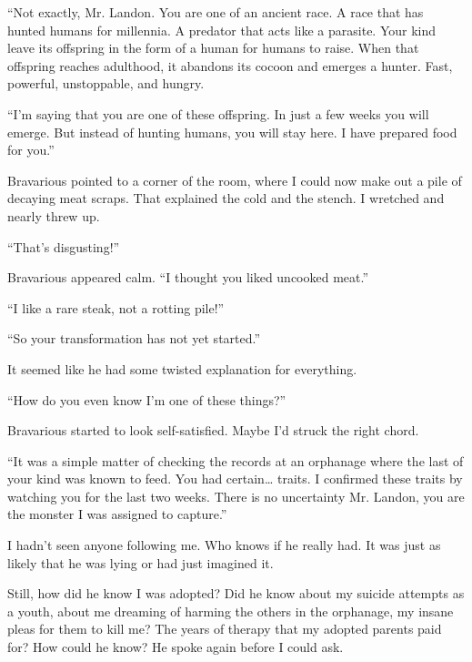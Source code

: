 ``Not exactly, Mr. Landon. You are one of an ancient race. A
race that has hunted humans for millennia. A predator that acts
like a parasite. Your kind leave its offspring in the form of a
human for humans to raise. When that offspring reaches adulthood,
it abandons its cocoon and emerges a hunter. Fast, powerful,
unstoppable, and hungry.



``I'm saying that you are one of these offspring. In just a
few weeks you will emerge. But instead of hunting humans, you will
stay here. I have prepared food for you.''



Bravarious pointed to a corner of the room, where I could now make
out a pile of decaying meat scraps. That explained the cold and the
stench. I wretched and nearly threw up.



``That's disgusting!''



Bravarious appeared calm. ``I thought you liked uncooked
meat.''



``I like a rare steak, not a rotting pile!''



``So your transformation has not yet started.''



It seemed like he had some twisted explanation for
everything.



``How do you even know I'm one of these
things?''



Bravarious started to look self-satisfied. Maybe I'd struck
the right chord.



``It was a simple matter of checking the records at an
orphanage where the last of your kind was known to feed. You had
certain{\ldots} traits. I confirmed these traits by watching you
for the last two weeks. There is no uncertainty Mr. Landon, you are
the monster I was assigned to capture.''



I hadn't seen anyone following me. Who knows if he really
had. It was just as likely that he was lying or had just imagined
it.



Still, how did he know I was adopted? Did he know about my suicide
attempts as a youth, about me dreaming of harming the others in the
orphanage, my insane pleas for them to kill me? The years of
therapy that my adopted parents paid for? How could he know? He
spoke again before I could ask.



